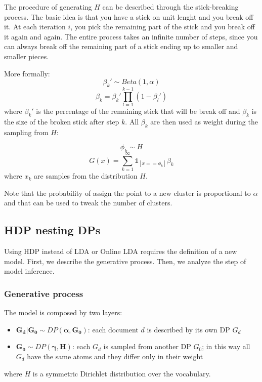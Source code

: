 The procedure of generating $H$ can be described through the stick-breaking process.
The basic idea is that you have a stick on unit lenght and you break off it.
At each iteration $i$, you pick the remaining part of the stick and you break off it again and again.
The entire process takes an infinite number of steps, since you can always break off the remaining part
of a stick ending up to smaller and smaller pieces.

More formally:
\begin{equation*}
    \beta_k' \sim \mathit{Beta}(1, \alpha)
\end{equation*}
\begin{equation*}
    \beta_k = \beta_k' \prod_{l=1}^{k-1} (1 - \beta_l')
\end{equation*}
where $\beta_k'$ is the percentage of the remaining stick that will be break off
and $\beta_k$ is the size of the broken stick after step $k$.
All $\beta_k$ are then used as weight during the sampling from $H$:

\begin{equation*}
    \phi_k \sim H
\end{equation*}
\begin{equation*}
    G(x) = \sum_{k=1}^{\infty} \mathbb{1}_{[x == \phi_k]} \beta_k
\end{equation*}
where $x_k$ are samples from the distribution $H$.

Note that the probability of assign the point to a new cluster
is proportional to $\alpha$ and that can be used to tweak the number of clusters.

\subsection{HDP nesting DPs}
Using HDP instead of LDA or Online LDA requires the definition of a new model.
First, we describe the generative process.
Then, we analyze the step of model inference.

\subsubsection{Generative process}
The model is composed by two layers:
\begin{itemize}
    \item $\boldsymbol{G_d | G_0 \sim \mathit{DP}(\alpha, G_0)}$: each document $d$ is described by its own DP $G_d$
    \item $\boldsymbol{G_0 \sim \mathit{DP}(\gamma, H)}$: each $G_d$ is sampled from another DP $G_0$; in this way all $G_d$ have the same atoms and they differ only in their weight
\end{itemize}
where $H$ is a symmetric Dirichlet distribution over the vocabulary.

